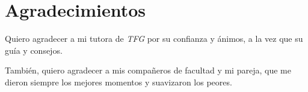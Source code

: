 \chapter*{Agradecimientos}
Quiero agradecer a mi tutora de \textit{TFG} por su confianza y ánimos, a la vez que su guía y consejos.

También, quiero agradecer a mis compañeros de facultad y mi pareja, que me dieron siempre los mejores momentos y suavizaron los peores.
